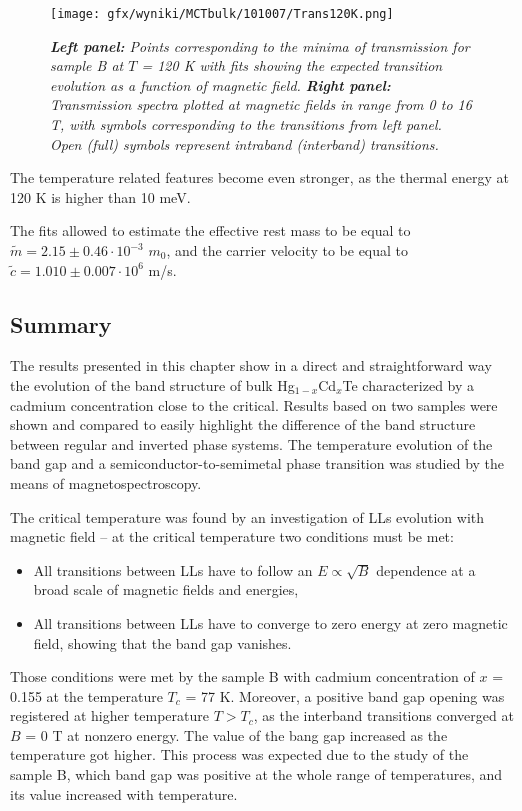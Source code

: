 \documentclass[titlepage,a4paper]{book}
\begin{document}
\begin{figure}[H]
	\centering
	\texttt{[image: gfx/wyniki/MCTbulk/101007/Trans120K.png]}
	\vspace{-10pt}
	\caption{\textit{\textbf{Left panel:} Points corresponding to the minima of transmission for sample B at $T$ = 120 K with fits showing the expected transition evolution as a function of magnetic field. \textbf{Right panel:} Transmission spectra plotted at magnetic fields in range from 0 to 16 T, with symbols corresponding to the transitions from left panel. Open (full) symbols represent intraband (interband) transitions.}}
	\label{fig:Spectra_101007_120K}
\end{figure}
The temperature related features become even stronger, as the thermal energy at 120 K is higher than 10 meV.

The fits allowed to estimate the effective rest mass to be equal to $\tilde m = 2.15 \pm 0.46 \cdot 10^{-3}$ $m_0$, and the carrier velocity to be equal to $\tilde{c} = 1.010 \pm 0.007 \cdot 10^6$ m/s.

\subsection{Summary}
The results presented in this chapter show in a direct and straightforward way the evolution of the band structure of bulk Hg$_{1-x}$Cd$_{x}$Te characterized by a cadmium concentration close to the critical. Results based on two samples were shown and compared to easily highlight the difference of the band structure between regular and inverted phase systems. The temperature evolution of the band gap and a semiconductor-to-semimetal phase transition was studied by the means of magnetospectroscopy. 

The critical temperature was found by an investigation of LLs evolution with magnetic field -- at the critical temperature two conditions must be met: 
\begin{itemize}
\item All transitions between LLs have to follow an $E \propto \sqrt{B}$ dependence at a broad scale of magnetic fields and energies,
\item All transitions between LLs have to converge to zero energy at zero magnetic field, showing that the band gap vanishes.
\end{itemize}

Those conditions were met by the sample B with cadmium concentration of $x$ = 0.155 at the temperature $T_c$ = 77 K. Moreover, a positive band gap opening was registered at higher temperature $T > T_c$, as the interband transitions converged at $B$ = 0 T at nonzero energy. The value of the bang gap increased as the temperature got higher. This process was expected due to the study of the sample B, which band gap was positive at the whole range of temperatures, and its value increased with temperature.  
\end{document}

